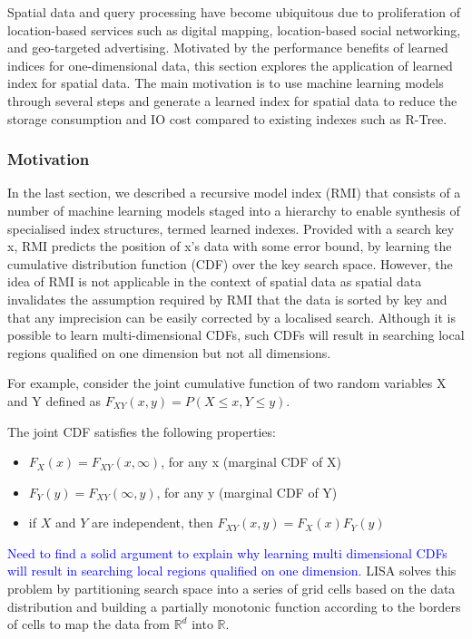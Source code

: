 Spatial data and query processing have become ubiquitous due to proliferation of location-based services such as digital mapping, location-based social networking,
and geo-targeted advertising. Motivated by the performance benefits of learned indices
for one-dimensional data, this section explores the application of learned index for spatial data. The main motivation is to use machine learning models through several steps and generate a learned index for spatial data to reduce the storage consumption and IO cost compared to existing indexes such as R-Tree.

\subsubsection{Motivation}
In the last section, we described a recursive model index (RMI) that consists of a
number of machine learning models staged into a hierarchy to enable synthesis of specialised index structures, termed learned indexes. Provided with a search key x, RMI predicts the position of x's data with some error bound, by learning the cumulative distribution function (CDF) over the key search space. However, the idea of RMI is not applicable in the context of spatial data as spatial data invalidates the assumption required by RMI that the data is sorted by key and that any imprecision can be easily corrected by a localised search. Although it is possible to learn multi-dimensional CDFs, such CDFs will result in searching local regions qualified on one dimension but not all dimensions.

For example, consider the joint cumulative function of two random variables X and Y defined as $F_{XY}(x, y)=P(X\leq x, Y\leq y)$.

The joint CDF satisfies the following properties:

\begin{itemize}
  \item  {$F_X(x)=F_{XY}(x,\infty)$, for any x (marginal CDF of X)}
  \item  {$F_Y(y)=F_{XY}(\infty,y)$, for any y (marginal CDF of Y)}
  \item  {if $X$ and $Y$ are independent, then $F_{XY}(x,y)=F_X(x)F_Y(y)$}
\end{itemize}

\textcolor{blue} {Need to find a solid argument to explain why learning multi dimensional CDFs will result in  searching local regions qualified on one dimension. }
LISA solves this problem by partitioning search space into a series of grid cells based on the data distribution and building a partially monotonic function according to the borders of cells to map the data from $\mathbb{R}^d$ into $\mathbb{R}$.


